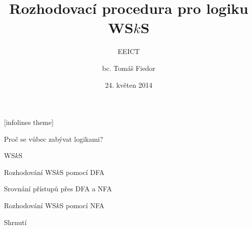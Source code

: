 \documentclass{beamer}
\title[Rozhodovací procedura pro logiku WS$k$S]{Rozhodovací procedura pro logiku
WS$k$S}
\subtitle{EEICT}
\author[T. Fiedor]{bc. Tomáš Fiedor}
\date{24. květen 2014}
\institute[vedoucí: Lengál]{pod vedením Ing. Ondřeje Lengála}
\begin{document}
[infolines theme]

  \begin{frame}[plain]
    \titlepage
  \end{frame}

  \begin{frame}{Proč se vůbec zabývat logikami?}
  
  \end{frame}	

  \begin{frame}{WS$k$S}
  
  \end{frame}
  
  \begin{frame}{Rozhodování WS$k$S pomocí DFA}
  
  \end{frame}
  
  \begin{frame}{Srovnání přístupů přes DFA a NFA}
  
  \end{frame}
  
  \begin{frame}{Rozhodování WS$k$S pomocí NFA}
  
  \end{frame}
  
  \begin{frame}{Shrnutí}
  
  \end{frame}
\end{document}

